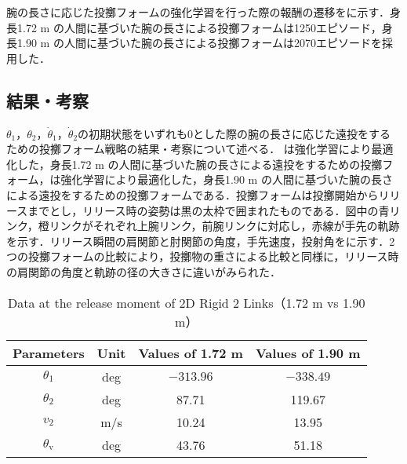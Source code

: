 腕の長さに応じた投擲フォームの強化学習を行った際の報酬の遷移をに示す．身長1.72 m の人間に基づいた腕の長さによる投擲フォームは1250エピソード，身長1.90 m の人間に基づいた腕の長さによる投擲フォームは2070エピソードを採用した．


\subsection{結果・考察}
$\theta_{1}$，$\theta_{2}$，$\dot{\theta}_{1}$，$\dot{\theta}_{2}$の初期状態をいずれも0とした際の腕の長さに応じた遠投をするための投擲フォーム戦略の結果・考察について述べる．
は強化学習により最適化した，身長1.72 m の人間に基づいた腕の長さによる遠投をするための投擲フォーム，は強化学習により最適化した，身長1.90 m の人間に基づいた腕の長さによる遠投をするための投擲フォームである．投擲フォームは投擲開始からリリースまでとし，リリース時の姿勢は黒の太枠で囲まれたものである．図中の青リンク，橙リンクがそれぞれ上腕リンク，前腕リンクに対応し，赤線が手先の軌跡を示す．リリース瞬間の肩関節と肘関節の角度，手先速度，投射角をに示す．2つの投擲フォームの比較により，投擲物の重さによる比較と同様に，リリース時の肩関節の角度と軌跡の径の大きさに違いがみられた．

\begin{table}[tb]
  \begin{center}
    \caption{Data at the release moment of 2D Rigid 2 Links（1.72 m vs 1.90 m）}
    \begin{tabular}{c|c|c|c}
      \hline
      Parameters & Unit & Values of 1.72 m & Values of 1.90 m \\
      \hline
      $\theta_{1}$ & deg & $-313.96$ & $-338.49$ \\
      $\theta_{2}$ & deg & 87.71 & 119.67 \\
      $v_{2}$ & m/s & 10.24 & 13.95 \\
      $\theta_{\mathrm{v}}$ & deg & 43.76 & 51.18 \\
      \hline
    \end{tabular}
  \end{center}
\end{table}

